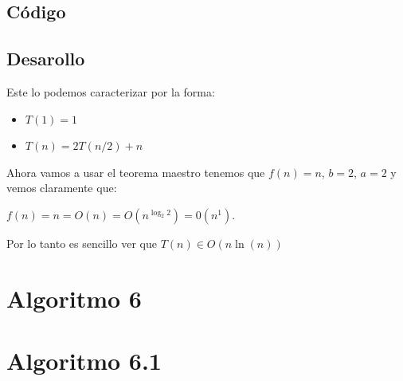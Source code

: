 \documentclass[12pt, fleqn]{article}                            %
\theoremstyle{break}                                            %
\begin{document}
    \subsection{Código}

        


    \vspace{1em}
    \subsection{Desarollo}

        Este lo podemos caracterizar por la forma:
        \begin{itemize}
            \item $T(1) = 1$
            \item $T(n) = 2T(n / 2) + n$
        \end{itemize}

        Ahora vamos a usar el teorema maestro tenemos que $f(n) = n$, $b = 2$, $a = 2$
        y vemos claramente que: 

        $f(n) = n = O(n) = O(n ^{\log_2 2}) = 0(n^1)$.

        Por lo tanto es sencillo ver que $T(n) \in O(n \ln(n))$





\clearpage
\section{Algoritmo 6}


    \section{Algoritmo 6.1}
\end{document}
